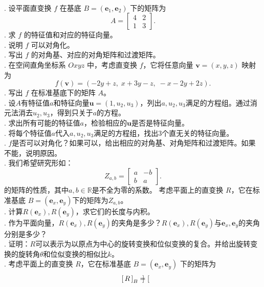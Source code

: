 \documentclass[12pt,UTF8]{ctexbook}
\begin{document}
\begin{xt}
    \mbox{} \\
    . 设平面直变换 $f$ 在基底 $B=(\mathbf{e}_1,\mathbf{e}_2)$ 下的矩阵为
    \[
    A = \begin{bmatrix}
    4 & 2 \\
    1 & 3
    \end{bmatrix}.
    \]
    . 求 $f$ 的特征值和对应的特征向量。\\
    . 说明 $f$ 可以对角化。\\
    . 写出 $f$ 的对角基、对应的对角矩阵和过渡矩阵。\\
    . 在空间直角坐标系 $Oxyz$ 中，考虑直变换 $f$，它将任意向量 $\mathbf{v}=(x,y,z)$ 映射为
    \[
    f(\mathbf{v}) = (-2y + z,\; x + 3y -z,\; -x - 2y + 2z).
    \]
    . 写出 $f$ 在标准基底下的矩阵 $A$。\\
    . 设$A$有特征值$a$和特征向量$\mathbf{u} = (1,u_2,u_3)$，列出$a,u_2,u_3$满足的方程组。通过消元法消去$u_2,u_3$，得到只关于$a$的方程。\\
    . 求出所有可能的特征值$a$，检验相应的$\mathbf{u}$是否是特征向量。\\
    . 将每个特征值$a$代入$a,u_2,u_3$满足的方程组，找出$3$个直无关的特征向量。\\
    . $f$是否可以对角化？如果可以，给出相应的对角基、对角矩阵和过渡矩阵。如果不能，说明原因。\\
    . 我们希望研究形如：
    \[
    Z_{a,b} = \begin{bmatrix}
    a & -b \\   
    b & a
    \end{bmatrix}.
    \]
    的矩阵的性质，其中$a,b\in\mathbb{R}$是不全为零的系数。
    考虑平面上的直变换 $R$，它在标准基底 $B=(\mathbf{e}_x,\mathbf{e}_y)$下的矩阵为$Z_{a,b}$。\\
    . 计算$R(\mathbf{e}_x),R(\mathbf{e}_y)$，求它们的长度与内积。\\
    . 作为平面向量，$R(\mathbf{e}_x),R(\mathbf{e}_y)$的夹角是多少？$R(\mathbf{e}_x),R(\mathbf{e}_y)$与$\mathbf{e}_x,\mathbf{e}_y$的夹角分别是多少？\\
    . 证明：$R$可以表示为以原点为中心的旋转变换和位似变换的复合。并给出旋转变换的旋转角$\theta$和位似变换的相似比$k$。\\
    . 考虑平面上的直变换 $R$，它在标准基底 $B=(\mathbf{e}_x,\mathbf{e}_y)$ 下的矩阵为
    \[
    \bmat{R}[B] = \begin{bmatrix}

\end{bmatrix}\]
\end{xt}
\end{document}
